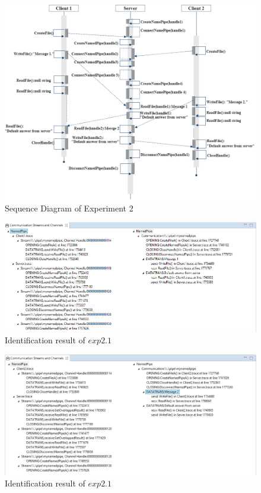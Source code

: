 \begin{figure}[H]
\centerline{\includegraphics[scale=0.6]{Figures/exp2}}
 \caption{Sequence Diagram of Experiment 2}
\label{exp2}
\end{figure}

\begin{figure}[H]
\centerline{\includegraphics[scale=0.55]{Figures/result21}}
 \caption{Identification result of $exp2.1$}
\label{result21}
\end{figure}

\begin{figure}[H]
\centerline{\includegraphics[scale=0.55]{Figures/result22}}
 \caption{Identification result of $exp2.1$}
\label{result22}
\end{figure}


